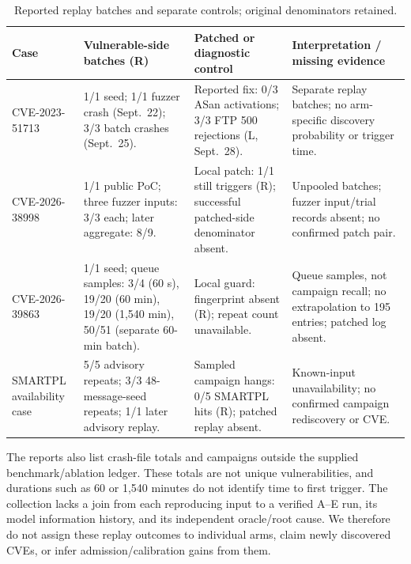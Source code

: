 \begin{table}[!tbp]
\centering\small
\caption{Reported replay batches and separate controls; original denominators retained.}
\label{tab:cveresults}
\begin{tabularx}{\textwidth}{@{}>{\raggedright\arraybackslash}p{} Y Y Y@{}}
\toprule
Case & Vulnerable-side batches (R) & Patched or diagnostic control & Interpretation / missing evidence \\
\midrule
\mbox{CVE-2023-51713} & 1/1 seed; 1/1 fuzzer crash (Sept.~22); 3/3 batch crashes (Sept.~25). & Reported fix: 0/3 ASan activations; 3/3 FTP 500 rejections (L, Sept.~28). & Separate replay batches; no arm-specific discovery probability or trigger time. \\
\addlinespace[3pt]
\mbox{CVE-2026-38998} & 1/1 public PoC; three fuzzer inputs: 3/3 each; later aggregate: 8/9. & Local patch: 1/1 still triggers (R); successful patched-side denominator absent. & Unpooled batches; fuzzer input/trial records absent; no confirmed patch pair. \\
\addlinespace[3pt]
\mbox{CVE-2026-39863} & 1/1 seed; queue samples: 3/4 (60 s), 19/20 (60 min), 19/20 (1,540 min), 50/51 (separate 60-min batch). & Local guard: fingerprint absent (R); repeat count unavailable. & Queue samples, not campaign recall; no extrapolation to 195 entries; patched log absent. \\
\addlinespace[3pt]
SMARTPL availability case & 5/5 advisory repeats; 3/3 48-message-seed repeats; 1/1 later advisory replay. & Sampled campaign hangs: 0/5 SMARTPL hits (R); patched replay absent. & Known-input unavailability; no confirmed campaign rediscovery or CVE. \\
\bottomrule
\end{tabularx}
\end{table}

The reports also list crash-file totals and campaigns outside the supplied benchmark/ablation ledger. These totals are not unique vulnerabilities, and durations such as 60 or 1,540 minutes do not identify time to first trigger. The collection lacks a join from each reproducing input to a verified A--E run, its model information history, and its independent oracle/root cause. We therefore do not assign these replay outcomes to individual arms, claim newly discovered CVEs, or infer admission/calibration gains from them.

